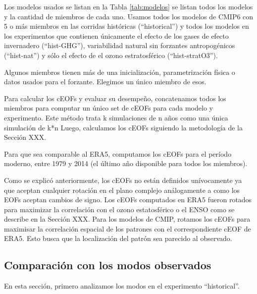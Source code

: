 \documentclass[12pt,oneside]{reedthesis}
\begin{document}
Los modelos usados se listan en la Tabla \ref{tab:modelos} se listan todos los modelos y la cantidad de miembros de cada uno.
Usamos todos los modelos de CMIP6 con 5 o más miembros en las corridas históricas (``historical'') y todos los modelos en los experimentos que contienen únicamente el efecto de los gases de efecto invernadero (``hist-GHG''), variabilidad natural sin forzantes antropogénicos (``hist-nat'') y sólo el efecto de el ozono estratosférico (``hist-stratO3'').

Algunos miembros tienen más de una inicialización, parametrización física o datos usados para el forzante.
Elegimos un único miembro de esos.

Para calcular los cEOFs y evaluar su desempeño, concatenamos todos los miembros para computar un único set de cEOFs para cada modelo y experimento.
Este método trata k simulaciones de n años como una única simulación de k*n
Luego, calculamos los cEOFs siguiendo la metodología de la Sección XXX.

Para que sea comparable al ERA5, computamos los cEOFs para el período moderno, entre 1979 y 2014 (el último año disponible para todos los miembros).

Como se explicó anteriormente, los cEOFs no están definidos unívocamente ya que aceptan cualquier rotación en el plano complejo análogamente a como los EOFs aceptan cambios de signo.
Los cEOFs computados en ERA5 fueron rotados para maximizar la correlación con el ozono estatosférico o el ENSO como se describe en la Sección XXX.
Para los modelos de CMIP, rotamos los cEOFs para maximisar la correlación espacial de los patrones con el correspondiente cEOF de ERA5.
Esto busca que la localización del patrón sea parecido al observado.

\hypertarget{comparaciuxf3n-con-los-modos-observados}{%
\subsection{Comparación con los modos observados}\label{comparaciuxf3n-con-los-modos-observados}}

En esta sección, primero analizamos los modos en el experimento ``historical''.
\end{document}
